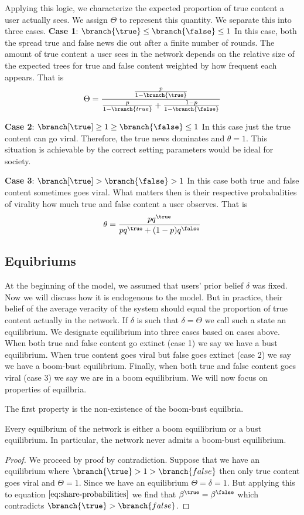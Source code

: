 Applying this logic, we characterize the expected proportion of true content a user actually sees. We assign $\Theta$ to represent this quantity. We separate this into three cases. 
\textbf{Case 1}: $\branch{\true} \leq \branch{\false} \leq 1 $ 
In this case, both the spread true and false news die out after a finite number of rounds. The amount of true content a user sees in the network depends on the relative size of the expected trees for true and false content weighted by how frequent each appears. That is 
\[ \Theta = \frac{ \frac{p}{ 1 - \branch{\true}}}{ \frac{p}{1-\branch{true}} + \frac{1-p}{1-\branch{\false}}} \]


\textbf{Case 2}:  $\branch[\true] \geq  1 \geq \branch{\false} \leq 1 $ 
In this case just the true content can go viral. Therefore, the true news dominates and $\theta=1$. This situation is achievable by the correct setting parameters would be ideal for society. 

\textbf{Case 3}:  $\branch[\true] >\branch{\false} >  1 $ 
In this case both true and false content sometimes goes viral. What matters then is their respective probabalities of virality how much true and false content a user observes. That is 
\begin{equation}
    \theta = \frac{pq^\true}{pq^\true + (1-p)q^\false } 
\end{equation}


\subsection{Equibriums} 

At the beginning of the model, we assumed that users' prior belief $\delta$ was fixed. Now we will discuss how it is endogenous to the model. But in practice, their belief of the average veracity of the system should equal the proportion of true content actually in the network. If $\delta $ is such that $\delta = \Theta$ we call such a state an equilibrium. We designate equilibrium into three cases based on cases above. When both true and false content go extinct (case 1) we say we have a bust equilibrium. When true content goes viral but false goes extinct (case 2) we say we have a boom-bust equilibrium. Finally, when both true and false content goes viral (case 3) we say we are in a boom equilibrium.  We will now focus on properties of equilbria. 

The first property is the non-existence of the boom-bust equilbria. 
\begin{theorem}
    Every equilbrium of the network is either a boom equilibrium or a bust equilibrium. In particular, the network never admits a boom-bust equilibrium. 
\end{theorem}
\begin{proof}
    We proceed by proof by contradiction. Suppose that we have an equilibrium where $\branch{\true} > 1 > \branch{false}$ then only true content goes viral and $\Theta=1$. Since we have an equilibrium $\Theta = \delta = 1$. But applying this to equation $\ref{eq:share-probabilities}$ we find that $\beta^\true = \beta^\false$ which contradicts $\branch{\true} >\branch{false}$. 
\end{proof}

